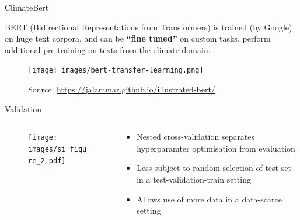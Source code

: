 \documentclass[9pt]{beamer}
\begin{document}
\begin{frame}{ClimateBert}

BERT (Bidirectional Representations from Transformers) is trained (by Google) on huge text corpora, and can be \textbf{``fine tuned''} on custom tasks. \cite{webersinke_climatebert_2021} perform additional pre-training on texts from the climate domain.

\begin{figure}
	\texttt{[image: images/bert-transfer-learning.png]}
	\caption{Source: \url{https://jalammar.github.io/illustrated-bert/}}
\end{figure}



\end{frame}



\begin{frame}{Validation}
\begin{columns}
	\begin{column}{0.682\linewidth}
		\begin{figure}
			\texttt{[image: images/si\_figure\_2.pdf]}
		\end{figure}
	\end{column}
	\begin{column}{0.318\linewidth}
		\begin{itemize}
			\item Nested cross-validation separates hyperparamter optimisation from evaluation
			\item Less subject to random selection of test set in a test-validation-train setting
			\item Allows use of more data in a data-scarce setting
		\end{itemize}
	\end{column}
\end{columns}
\end{frame}
\end{document}
